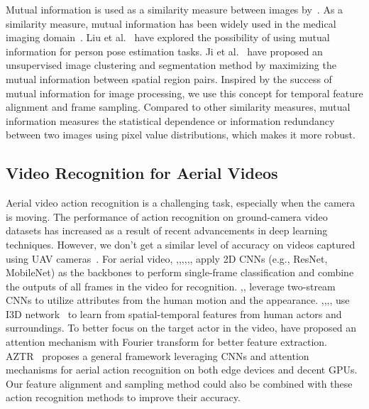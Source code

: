 \documentclass[10pt,twocolumn,letterpaper]{article}
\begin{document}
Mutual information is used as a similarity measure between images by~\cite{Viola1995AlignmentBM,Maes1997MultimodalityIR}.  As a similarity measure, mutual information has been widely used in the medical imaging domain~\cite{Pluim2003MutualinformationbasedRO,Klein2007EvaluationOO}. Liu et al.~\cite{liu2022temporal} have explored the possibility of using mutual information for person pose estimation tasks. Ji et al.~\cite{Ji2018InvariantID} have proposed an unsupervised image clustering and segmentation method by maximizing the mutual information between spatial region pairs.
Inspired by the success of mutual information for image processing, we use this concept for temporal feature alignment and frame sampling.  Compared to other similarity measures, mutual information measures the statistical dependence or information redundancy between two images using pixel value distributions, which makes it more robust.



\subsection{Video Recognition for Aerial Videos}
Aerial video action recognition is a challenging task, especially when the camera is moving. The performance of action recognition on ground-camera video datasets has increased as a result of recent advancements in deep learning techniques. However, we don't get a similar level of accuracy on videos captured using UAV cameras~\cite{nguyen2022state}. For aerial video, \cite{geraldes2019uav},\cite{mliki2020human},\cite{mishra2020drone},\cite{mou2020event},\cite{barbed2020fine},\cite{gammulle2019predicting},\cite{mou2020event} apply 2D CNNs (e.g., ResNet, MobileNet) as the backbones to perform single-frame classification and combine the outputs of all frames in the video for recognition. \cite{barekatain2017okutama},\cite{perera2019drone},\cite{perera2020multiviewpoint} leverage two-stream CNNs to utilize attributes from the human motion and the appearance. \cite{choi2020unsupervised},\cite{demir2021tinyvirat},\cite{li2021uav},\cite{mou2020event},\cite{sultani2021human} use I3D network~\cite{carreira2017quo} to learn from spatial-temporal features from human actors and surroundings. To better focus on the target actor in the video, \cite{divya2022far,kothandaraman2023frequency} have proposed an attention mechanism with Fourier transform for better feature extraction. AZTR~\cite{wang2023aztr} proposes a general framework leveraging CNNs and attention mechanisms for aerial action recognition on both edge devices and decent GPUs.  Our feature alignment and sampling method could also be combined with these action recognition methods to improve their accuracy.
\end{document}
